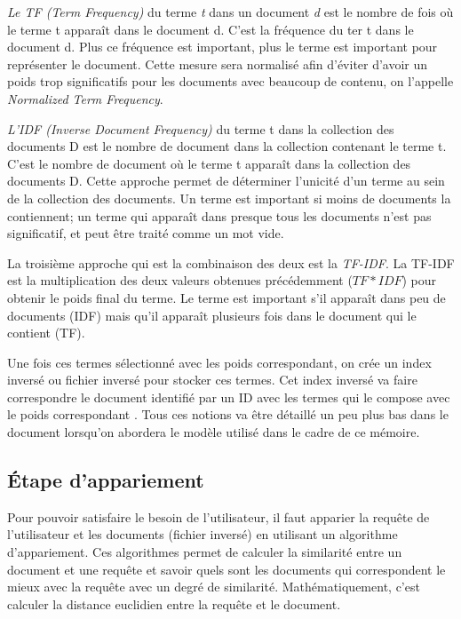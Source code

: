 \textit{Le TF (Term Frequency)} du terme \textit{t} dans un document \textit{d} est le nombre de fois où le terme t apparaît dans le document d. C'est la fréquence du ter t dans le document d. Plus ce fréquence est important, plus le terme est important pour représenter le document. Cette mesure sera normalisé afin d'éviter d'avoir un poids trop significatifs pour les documents avec beaucoup de contenu, on l'appelle \textit{Normalized Term Frequency}.

\textit{L'IDF (Inverse Document Frequency)} du terme t dans la collection des documents D est le nombre de document dans la collection contenant le terme t. C'est le nombre de document où le terme t apparaît dans la collection des documents D. Cette approche permet de déterminer l'unicité d'un terme au sein de la collection des documents. Un terme est important si moins de documents la contiennent; un terme qui apparaît dans presque tous les documents n'est pas significatif, et peut être traité comme un mot vide.

La troisième approche qui est la combinaison des deux est la \textit{TF-IDF}. La TF-IDF est la multiplication des deux valeurs obtenues précédemment ($TF*IDF$) pour obtenir le poids final du terme. Le terme est important s'il apparaît dans peu de documents (IDF) mais qu'il apparaît plusieurs fois dans le document qui le contient (TF).

Une fois ces termes sélectionné avec les poids correspondant, on crée un index inversé ou fichier inversé pour stocker ces termes. Cet index inversé va faire correspondre le document identifié par un ID avec les termes qui le compose avec le poids correspondant \citep*{vsm, vsm-for-arabic-language, sarch-engine-vsm, modern-ir}. Tous ces notions va être détaillé un peu plus bas dans le document lorsqu'on abordera le modèle utilisé dans le cadre de ce mémoire.

\subsection{Étape d’appariement}
\label{sec:etape-appariement}
Pour pouvoir satisfaire le besoin de l'utilisateur, il faut apparier la requête de l'utilisateur et les documents (fichier inversé) en utilisant un algorithme d'appariement. Ces algorithmes permet de calculer la similarité entre un document et une requête et savoir 
quels sont les documents qui correspondent le mieux avec la requête avec un degré de similarité. Mathématiquement, c'est calculer la distance euclidien entre la requête et le document.

